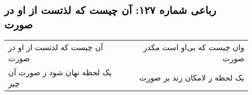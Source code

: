 \begin{center}
\section*{رباعی شماره ۱۲۷: آن چیست که لذتست از او در صورت}
\label{sec:0127}
\begin{longtable}{l p{0.5cm} r}
آن چیست که لذتست از او در صورت
&&
وان چیست که بی‌او است مکدر صورت
\\
یک لحظه نهان شود ز صورت آن چیز
&&
یک لحظه ز لامکان زند بر صورت
\\
\end{longtable}
\end{center}
